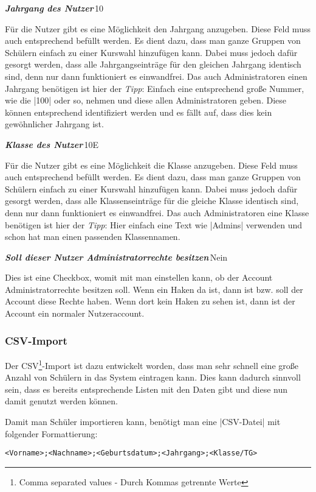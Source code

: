 \documentclass[ngerman]{ltxdoc}
\newcommand{\DescribeOption}[4]{
  \DescribeMacro{#1}
  \begin{minipage}[t]{\textwidth}
    \textit{\textbf{\textcolor{mLightGreen}{#2}}}\dotfill\,#3\par
    \begingroup
    \vspace{0.5em}#4\par
    \endgroup
  \end{minipage}
}
\begin{document}
\DescribeOption{Jahrgang}{Jahrgang des Nutzer}{10}{
  Für die Nutzer gibt es eine Möglichkeit den Jahrgang anzugeben. Diese Feld muss
  auch entsprechend befüllt werden. Es dient dazu, dass man ganze Gruppen von
  Schülern einfach zu einer Kurswahl hinzufügen kann. Dabei muss jedoch dafür
  gesorgt werden, dass alle Jahrgangseinträge für den gleichen Jahrgang identisch
  sind, denn nur dann funktioniert es einwandfrei. Das auch Administratoren
  einen Jahrgang benötigen ist hier der \textit{Tipp}: Einfach eine entsprechend
  große Nummer, wie die |100| oder so, nehmen und diese allen Administratoren
  geben. Diese können entsprechend identifiziert werden und es fällt auf, dass
  dies kein gewöhnlicher Jahrgang ist.
}

\DescribeOption{Klasse}{Klasse des Nutzer}{10E}{
  Für die Nutzer gibt es eine Möglichkeit die Klasse anzugeben. Diese Feld muss
  auch entsprechend befüllt werden. Es dient dazu, dass man ganze Gruppen von
  Schülern einfach zu einer Kurswahl hinzufügen kann. Dabei muss jedoch dafür
  gesorgt werden, dass alle Klassenseinträge für die gleiche Klasse identisch
  sind, denn nur dann funktioniert es einwandfrei. Das auch Administratoren
  eine Klasse benötigen ist hier der \textit{Tipp}: Hier einfach eine Text wie
  |Admins| verwenden und schon hat man einen passenden Klassennamen.
}

\DescribeOption{Administrator}{Soll dieser Nutzer Administratorrechte besitzen}{Nein}{
  Dies ist eine Checkbox, womit mit man einstellen kann, ob der Account
  Administratorrechte besitzen soll. Wenn ein Haken da ist, dann ist bzw.
  soll der Account diese Rechte haben. Wenn dort kein Haken zu sehen ist, dann ist der
  Account ein normaler Nutzeraccount.
}

\subsubsection{CSV-Import}

Der CSV\footnote{Comma separated values - Durch Kommas getrennte Werte}-Import ist dazu entwickelt worden, dass man sehr schnell eine große
Anzahl von Schülern in das System eintragen kann. Dies kann dadurch sinnvoll sein,
dass es bereits entsprechende Listen mit den Daten gibt und diese nun damit
genutzt werden können.

Damit man Schüler importieren kann, benötigt man eine |CSV-Datei| mit folgender
Formattierung:

\begin{lstlisting}[style=tex]
<Vorname>;<Nachname>;<Geburtsdatum>;<Jahrgang>;<Klasse/TG>
\end{lstlisting}
\end{document}

